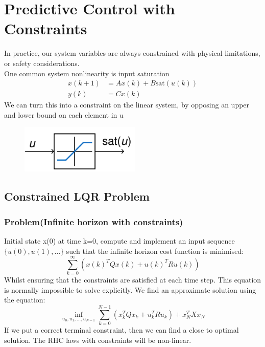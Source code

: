 \documentclass{article}
\begin{document}
\section{Predictive Control with Constraints}
In practice, our system variables are always constrained with physical limitations, or safety considerations. \\
One common system nonlinearity is input saturation 
\[
\begin{aligned}
    x(k+1) &= Ax(k) + B\text{sat}(u(k)) \\
    y(k) &= C x(k)
\end{aligned}
\]
We can turn this into a constraint on the linear system, by opposing an upper and lower bound on each element in u
\begin{figure}[H]
    \centering
    \includegraphics[width=0.3\linewidth]{Screenshot 2023-02-23 at 14.20.32.png}
\end{figure}
\subsection{Constrained LQR Problem}
\subsubsection*{Problem(Infinite horizon with constraints)}
Initial state x(0) at time k=0, compute and implement an input sequence $\{u(0),u(1),\hdots\}$ such that the infinite horizon cost function is minimised:
\[
\sum_{k=0}^{\infty}\left(x(k)^TQx(k) + u(k)^TRu(k)\right)
\]
Whilst ensuring that the constraints are satisfied at each time step. This equation is normally impossible to solve explicitly. We find an approximate solution using the equation:
\[
\inf_{u_0,u_1,\hdots,u_{N-1}} \sum_{k=0}^{N-1}\left(x_k^TQx_k + u_k^TRu_k \right) + x_N^TXx_N
\]
If we put a correct terminal constraint, then we can find a close to optimal solution. The RHC laws with constraints will be non-linear.
\end{document}
